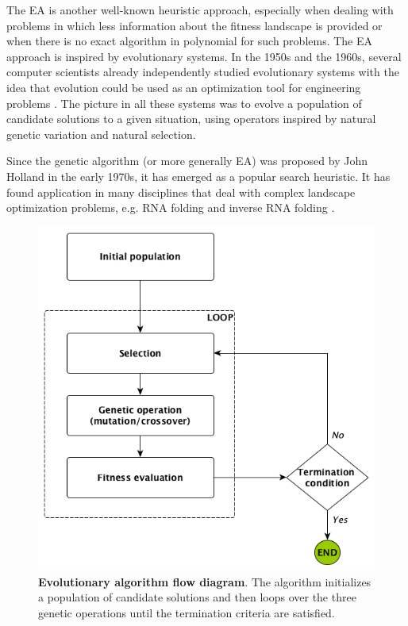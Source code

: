 The \ac{EA} is another well-known heuristic approach, especially when dealing with problems in which less information about the fitness landscape is provided or when there is no exact algorithm in polynomial for such problems. The \ac{EA} approach is inspired by evolutionary systems. In the 1950s and the 1960s, several computer scientists already independently studied evolutionary systems with the idea that evolution could be used as an optimization tool for engineering problems \cite{mitchell1998introduction}. The picture in all these systems was to evolve a population of candidate solutions to a given situation, using operators inspired by natural genetic variation and natural selection.

Since the genetic algorithm (or more generally \ac{EA}) was proposed by John Holland \cite{holland1992adaptation} in the early 1970s, it has emerged as a popular search heuristic. It has found application in many disciplines that deal with complex landscape optimization problems, e.g. RNA folding \cite{montaseri2016evolutionary,wiese2005algorithms} and inverse RNA folding \cite{esmaili2015erd, esmaili2014evolutionary, modena_2012}. 

\begin{figure}[t!]
	\includegraphics[width=1.0 \linewidth]{../res/images/arnaque/EA_draw.png}
	\caption{\textbf{Evolutionary algorithm flow diagram}. The algorithm initializes a population of candidate solutions and then loops over the three genetic operations until the termination criteria are satisfied. }\label{fig:EA}
\end{figure}

